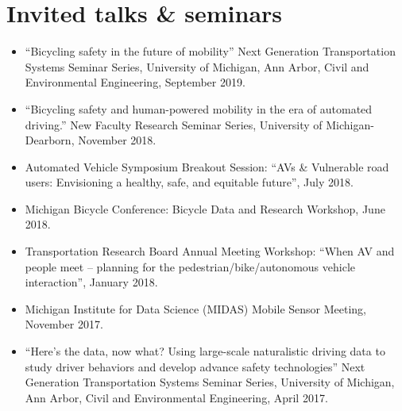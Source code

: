\documentclass[11pt]{article}
\newenvironment{main}
{\begin{adjustwidth}{3em}{}}
{\end{adjustwidth}}
\begin{document}
\section*{Invited talks \& seminars}
\begin{main}

\begin{itemize}
    \item “Bicycling safety in the future of mobility” Next Generation Transportation Systems Seminar Series, University of Michigan, Ann Arbor, Civil and Environmental Engineering, September 2019.

    \item “Bicycling safety and human-powered mobility in the era of automated driving.” New Faculty Research Seminar Series, University of Michigan-Dearborn, November 2018.

    \item Automated Vehicle Symposium Breakout Session: “AVs \& Vulnerable road users: Envisioning a healthy, safe, and equitable future”, July 2018.

    \item Michigan Bicycle Conference: Bicycle Data and Research Workshop, June 2018.

    \item Transportation Research Board Annual Meeting Workshop: “When AV and people meet – planning for the pedestrian/bike/autonomous vehicle interaction”, January 2018.

    \item Michigan Institute for Data Science (MIDAS) Mobile Sensor Meeting, November 2017.

    \item “Here's the data, now what? Using large-scale naturalistic driving data to study driver behaviors and develop advance safety technologies” Next Generation Transportation Systems Seminar Series, University of Michigan, Ann Arbor, Civil and Environmental Engineering, April 2017. 

\end{itemize}


\end{main}
\end{document}
